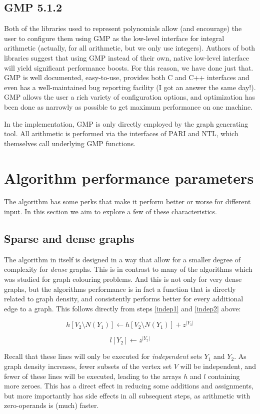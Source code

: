 \documentclass[a4paper]{article}
\begin{document}
\subsection{GMP 5.1.2}
Both of the libraries used to represent polynomials allow (and encourage) the user to configure them using GMP \cite{gmp} as the low-level interface for integral arithmetic (actually, for all arithmetic, but we only use integers). Authors of both libraries suggest that using GMP instead of their own, native low-level interface will yield significant performance boosts. For this reason, we have done just that. GMP is well documented, easy-to-use, provides both C and C++ interfaces and even has a well-maintained bug reporting facility (I got an answer the same day!). GMP allows the user a rich variety of configuration options, and optimization has been done as narrowly as possible to get maximum performance on one machine.

In the implementation, GMP is only directly employed by the graph generating tool. All arithmetic is performed via the interfaces of PARI and NTL, which themselves call underlying GMP functions.

\section{Algorithm performance parameters}
The algorithm has some perks that make it perform better or worse for different input. In this section we aim to explore a few of these characteristics.

\subsection{Sparse and dense graphs}\label{sparsedense}
The algorithm in itself is designed in a way that allow for a smaller degree of complexity for \emph{dense} graphs. This is in contrast to many of the algorithms which was studied for graph colouring problems. And this is not only for very dense graphs, but the algorithms performance is in fact a function that is directly related to graph density, and consistently performs better for every additional edge to a graph. This follows directly from steps \ref{indep1} and \ref{indep2} above:

$$ h[V_2 \setminus N(Y_1)] \leftarrow h[V_2 \setminus N(Y_1)] + z^{|Y_1|} $$

$$ l[Y_2] \leftarrow z^{|Y_2|} $$

Recall that these lines will only be executed for \emph{independent} sets $Y_1$ and $Y_2$. As graph density increases, fewer subsets of the vertex set $V$ will be independent, and fewer of these lines will be executed, leading to the arrays $h$ and $l$ containing more zeroes. This has a direct effect in reducing some additions and assignments, but more importantly has side effects in all subsequent steps, as arithmetic with zero-operands is (much) faster.
\end{document}
